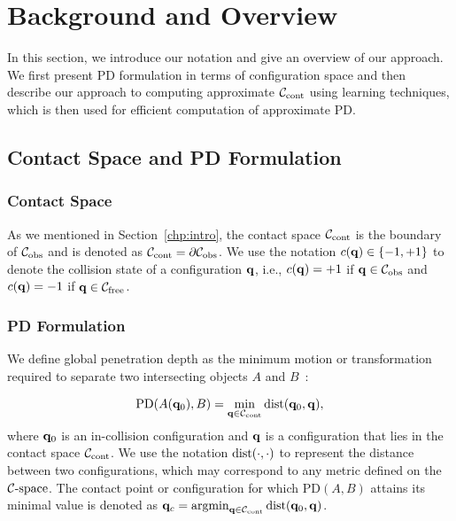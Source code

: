 \section{Background and Overview}
\label{sec:2:overview}
In this section, we introduce our notation and give an overview of our approach. We first present PD formulation in terms of configuration space and then describe our approach to computing approximate $\mathcal C_\text{cont}$ using learning techniques, which is then used for efficient computation of approximate PD.

\subsection{Contact Space and PD Formulation}
\subsubsection{Contact Space}
As we mentioned in Section~\ref{chp:intro}, the contact space $\mathcal C_\text{cont}$ is the boundary of $\mathcal C_{\text{obs}}$ and is denoted as $\mathcal C_\text{cont} =\partial \mathcal C_{\text{obs}}$. We use the notation $c(\mathbf q) \in \{-1,+1\}$ to denote the collision state of a configuration $\mathbf q$, i.e., $c(\mathbf q)=+1$ if $\mathbf q \in \mathcal C_{\text{obs}}$ and $c(\mathbf q)=-1$ if $\mathbf q \in \mathcal C_{\text{free}}$.

\subsubsection{PD Formulation}
\label{sec:2:overview:pdformulation}
We define global penetration depth as the minimum motion or transformation required to separate two intersecting objects $A$ and $B$~\cite{Agarwal:2000:CPD,Kim:2002:DEEP}:

\begin{align}
\label{eq:2:PDgdef} \text{PD}(A(\mathbf q_0), B) = \min_{\mathbf q \in
\mathcal C_\text{cont}} \operatorname{dist}(\mathbf q_0, \mathbf q),
\end{align}
where $\mathbf q_0$ is an in-collision configuration and $\mathbf q$ is a
configuration that lies in the contact space $\mathcal C_\text{cont}$.
We use the notation $\operatorname{dist}(\cdot, \cdot)$ to represent the distance between two configurations,
which may correspond to any metric defined on the $\mathcal C\text{-space}$. The
contact point or configuration for which PD$(A, B)$ attains its
minimal value is denoted as $\mathbf q_c = \operatorname{argmin}_{\mathbf q
\in \mathcal C_\text{cont}} \operatorname{dist}(\mathbf q_0, \mathbf q)$.


